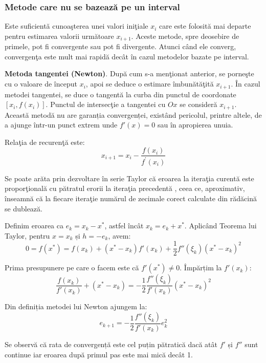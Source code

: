 \documentclass{exam}
\begin{document}
\subsubsection{Metode care nu se bazează pe un interval}

Este suficientă cunoaşterea unei valori iniţiale $x_i$ care este folosită mai
departe pentru estimarea valorii următoare $x_{i+1}$. Aceste metode, spre
deosebire de primele, pot fi convergente sau pot fi divergente. Atunci când ele
converg, convergenţa este mult mai rapidă decât în cazul metodelor bazate pe
interval.

\textbf{Metoda tangentei (Newton)}. După cum s-a menţionat anterior, se porneşte
cu o valoare de început $x_{i}$, apoi se deduce o estimare îmbunătăţită
$x_{i+1}$. În cazul metodei tangentei, se duce o tangentă la curba din punctul
de coordonate $[x_{i}, f(x_{i})]$. Punctul de intersecţie a tangentei cu $Ox$ se
consideră  $x_{i+1}$. Această metodă nu are garanția convergenței,
existând pericolul, printre altele, de a ajunge într-un punct extrem unde
$f'(x) = 0$ sau în apropierea unuia.

Relaţia de recurenţă este:
$$x_{i+1}=x_{i}-\frac{f(x_{i})}{f^{'}(x_{i})}$$

Se poate arăta prin dezvoltare în serie Taylor că eroarea la iteraţia curentă
este proporţională cu pătratul erorii la iteraţia precedentă \cite{Quad},
ceea ce, aproximativ, înseamnă că la fiecare iteraţie numărul de zecimale corect
calculate din rădăcină se dublează.

Definim eroarea ca $e_k = x_k - x^*$, astfel încât $x_k = e_k + x^*$. Aplicând
Teorema lui Taylor, pentru $x = x_k$ și $h = -e_k$, avem:
\begin{equation*}
	0 = f(x^*) = f(x_k) + (x^* - x_k) f'(x_k) + \frac{1}{2} f''(\xi_k) (x^* - x_k)^2
\end{equation*}

Prima presupunere pe care o facem este că $f'(x^*) \neq 0$. Împărțim la $f'(x_k)$:
\begin{equation*}
	\frac{f(x_k)}{f'(x_k)} + (x^* - x_k) = -\frac{1}{2} \frac{f''(\xi_k)}{f'(x_k)} (x^* - x_k)^2
\end{equation*}

Din definiția metodei lui Newton ajungem la:
\begin{equation*}
	e_{k+1} = - \frac{1}{2} \frac{f''(\xi_k)}{f'(x_k)} e_k^2
\end{equation*}

Se observă că rata de convergență este cel puțin pătratică dacă atât $f'$ și
$f''$ sunt continue iar eroarea după primul pas este mai mică decât 1.
\end{document}
